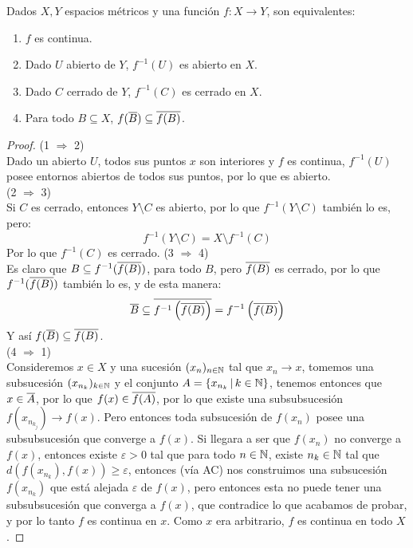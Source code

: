 \documentclass[12pt,a4paper]{book}
\begin{document}
\begin{teo}Dados $X,Y$ espacios métricos y una función $f:X \rightarrow Y$, son equivalentes:
\begin{enumerate}
\item $f$ es continua.
\item Dado $U$ abierto de $Y$, $f^{-1}(U)$ es abierto en $X$.
\item Dado $C$ cerrado de $Y$, $f^{-1}(C)$ es cerrado en $X$.
\item Para todo $B \subseteq X$, $f(\overline{B})\subseteq \overline{f(B)}$.
\end{enumerate}
\begin{proof}
(1 $\Rightarrow$ 2)\\
Dado un abierto $U$, todos sus puntos $x$ son interiores y $f$ es continua, $f^{-1}(U)$ posee entornos abiertos de todos sus puntos, por lo que es abierto.\\
(2 $\Rightarrow$ 3)\\
Si $C$ es cerrado, entonces $Y \setminus C$ es abierto, por lo que $f^{-1}(Y \setminus C )$ también lo es, pero:
$$ f^{-1}(Y \setminus C) = X \setminus f^{-1}(C)$$
Por lo que $f^{-1}(C)$ es cerrado.
(3 $\Rightarrow$ 4)\\
Es claro que $B \subseteq f^{-1} ( \overline{f(B)} )$, para todo $B$, pero $\overline{f(B)}$ es cerrado, por lo que $f^{-1} ( \overline{f(B)})$ también lo es, y de esta manera:
$$\overline{B} \subseteq \overline{f^{-1} \left( \overline{f(B)} \right)} = f^{-1} \left( \overline{f(B)} \right)$$
Y así $f(\overline{B}) \subseteq \overline{f(B)}$.\\
(4 $\Rightarrow$ 1)\\
Consideremos $x \in X$ y una sucesión $(x_n)_{{n} \in \mathbb{N}}$ tal que $x_n \rightarrow x$, tomemos una subsucesión $(x_{n_k})_{{k} \in \mathbb{N}}$ y el conjunto $A= \{x_{n_k}\,\vert\, k \in \mathbb{N}\}$, tenemos entonces que $x \in \overline{A}$, por lo que $f(x) \in \overline{f(A)}$, por lo que existe una subsubsucesión $f(x_{n_{k_j}}) \rightarrow f(x)$. Pero entonces toda subsucesión de $f(x_n)$ posee una subsubsucesión que converge a $f(x)$. Si llegara a ser que $f(x_n)$ no converge a $f(x)$, entonces existe $\varepsilon>0$ tal que para todo $n \in \mathbb{N}$, existe $n_k \in \mathbb{N}$ tal que $d(f(x_{n_k}),f(x)) \geq \varepsilon$, entonces (vía AC) nos construimos una subsucesión $f(x_{n_k})$ que está alejada $\varepsilon$ de $f(x)$, pero entonces esta no puede tener una subsubsucesión que converga a $f(x)$, que contradice lo que acabamos de probar, y por lo tanto $f$ es continua en $x$. Como $x$ era arbitrario, $f$ es continua en todo $X$.
\end{proof}
\end{teo}
\end{document}
